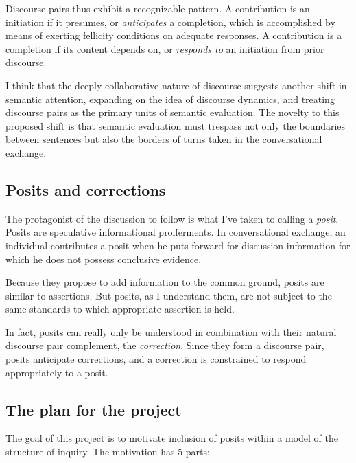 \documentclass[letterpaper,]{article}
\begin{document}
Discourse pairs thus exhibit a recognizable pattern. A contribution is
an initiation if it presumes, or \emph{anticipates} a completion, which
is accomplished by means of exerting fellicity conditions on adequate
responses. A contribution is a completion if its content depends on, or
\emph{responds to} an initiation from prior discourse.

I think that the deeply collaborative nature of discourse suggests
another shift in semantic attention, expanding on the idea of discourse
dynamics, and treating discourse pairs as the primary units of semantic
evaluation. The novelty to this proposed shift is that semantic
evaluation must trespass not only the boundaries between sentences but
also the borders of turns taken in the conversational exchange.

\subsection{Posits and corrections}\label{posits-and-corrections}

The protagonist of the discussion to follow is what I've taken to
calling a \emph{posit}. Posits are speculative informational
profferments. In conversational exchange, an individual contributes a
posit when he puts forward for discussion information for which he does
not possess conclusive evidence.

Because they propose to add information to the common ground, posits are
similar to assertions. But posits, as I understand them, are not subject
to the same standards to which appropriate assertion is held.

In fact, posits can really only be understood in combination with their
natural discourse pair complement, the \emph{correction}. Since they
form a discourse pair, posits anticipate corrections, and a correction
is constrained to respond appropriately to a posit.

\subsection{The plan for the project}\label{the-plan-for-the-project}

The goal of this project is to motivate inclusion of posits within a
model of the structure of inquiry. The motivation has 5 parts:
\end{document}

